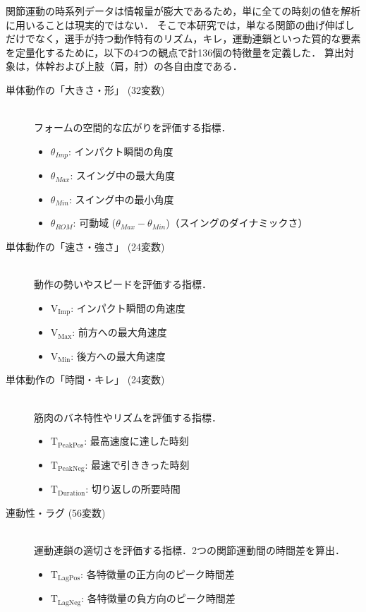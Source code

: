 \documentclass[../main]{subfiles}
\begin{document}
関節運動の時系列データは情報量が膨大であるため，単に全ての時刻の値を解析に用いることは現実的ではない．
そこで本研究では，単なる関節の曲げ伸ばしだけでなく，選手が持つ動作特有のリズム，キレ，運動連鎖といった質的な要素を定量化するために，以下の4つの観点で計136個の特徴量を定義した．
算出対象は，体幹および上肢（肩，肘）の各自由度である．
\begin{description}
  \item[単体動作の「大きさ・形」 (32変数)] \mbox{}\\
  フォームの空間的な広がりを評価する指標．
  \begin{itemize}
    \item $\theta_{Imp}$: インパクト瞬間の角度
    \item $\theta_{Max}$: スイング中の最大角度
    \item $\theta_{Min}$: スイング中の最小角度
    \item $\theta_{ROM}$: 可動域 ($\theta_{Max} - \theta_{Min}$)（スイングのダイナミックさ）
  \end{itemize}

  \item[単体動作の「速さ・強さ」 (24変数)] \mbox{}\\
  動作の勢いやスピードを評価する指標．
  \begin{itemize}
    \item $\mathrm{V_{Imp}}$: インパクト瞬間の角速度
    \item $\mathrm{V_{Max}}$: 前方への最大角速度
    \item $\mathrm{V_{Min}}$: 後方への最大角速度
  \end{itemize}

  \item[単体動作の「時間・キレ」 (24変数)] \mbox{}\\
  筋肉のバネ特性やリズムを評価する指標．
  \begin{itemize}
    \item $\mathrm{T_{PeakPos}}$: 最高速度に達した時刻
    \item $\mathrm{T_{PeakNeg}}$: 最速で引ききった時刻
    \item $\mathrm{T_{Duration}}$: 切り返しの所要時間
  \end{itemize}

  \item[連動性・ラグ (56変数)] \mbox{}\\
  運動連鎖の適切さを評価する指標．2つの関節運動間の時間差を算出．
  \begin{itemize}
    \item $\mathrm{T_{LagPos}}$: 各特徴量の正方向のピーク時間差
    \item $\mathrm{T_{LagNeg}}$: 各特徴量の負方向のピーク時間差
  \end{itemize}
\end{description}
\end{document}
